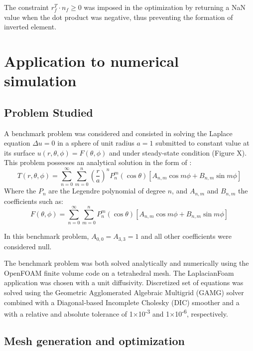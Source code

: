 \documentclass[11pt]{article}
\begin{document}
The constraint $r_f^T \cdot n_f \geq 0$ was imposed in the optimization by returning a NaN value when the dot product was negative, thus preventing the formation of inverted element.



\section{Application to numerical simulation}

\subsection{Problem Studied}

A benchmark problem was considered and consisted in solving the Laplace equation $\Delta u = 0$ in a sphere of unit radius $a=1$ submitted to constant value at its surface $u(r,\theta,\phi) = F(\theta,\phi)$ and under steady-state condition (Figure X). %
This problem possesses an analytical solution in the form of \cite{carslaw_jeager_1957}:
%
\begin{equation}
T(r, \theta, \phi) = \sum_{n=0}^\infty \sum_{m=0}^n \left(\frac{r}{a}\right)^n P_n^m(\cos \theta) \left[ A_{n,m} \cos m\phi + B_{n,m} \sin m\phi \right]
\end{equation} 
%
Where the $P_n$ are the Legendre polynomial of degree $n$, and $A_{n,m}$ and $B_{n,m}$ the coefficients such as:
%
\begin{equation}
F(\theta, \phi) = \sum_{n=0}^\infty \sum_{m=0}^n P_n^m(\cos \theta) \left[ A_{n,m} \cos m\phi + B_{n,m} \sin m\phi \right]
\end{equation}
%

In this benchmark problem, $A_{0,0} = A_{3,3}=1$ and all other coefficients were considered null.

The benchmark problem was both solved analytically and numerically using the OpenFOAM finite volume code on a tetrahedral mesh.
The LaplacianFoam application was chosen with a unit diffusivity.
Discretized set of equations was solved using the Geometric Agglomerated Algebraic Multigrid (GAMG) solver combined with a Diagonal-based Incomplete Cholesky (DIC) smoother and a with a relative and absolute tolerance of 1$\times$10\textsuperscript{-3} and 1$\times$10\textsuperscript{-6}, respectively.



\subsection{Mesh generation and optimization}
\end{document}
